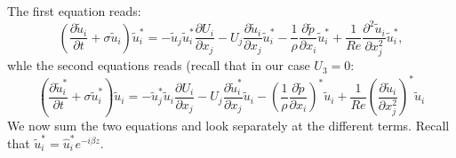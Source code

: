 \documentclass{jfm}
\begin{document}
The first equation reads:
%
\begin{equation}
\left( \frac{\partial \tilde{u}_i}{\partial t} + \sigma \tilde{u}_i \right) \tilde{u}^*_i =
- \tilde{u}_j \tilde{u}_i^* \frac{\partial U_i}{\partial x_j} - U_j \frac{\partial \tilde{u}_i}{\partial x_j} \tilde{u}_i^*
- \frac{1}{\rho} \frac{\partial \tilde{p}}{\partial x_i} \tilde{u}_i^* 
+ \frac{1}{Re} \frac{\partial^2 \tilde{u}_i}{\partial x_j^2} \tilde{u}_i^*,
\end{equation}
whle the second equations reads (recall that in our case $U_3=0$:
\begin{equation}
\left( \frac{\partial \tilde{u}_i^*}{\partial t} + \sigma \tilde{u}_i^* \right) \tilde{u}_i = 
- \tilde{u}_j^* \tilde{u}_i \frac{\partial U_i}{\partial x_j} - U_j \frac{\partial \tilde{u}_i^*}{\partial x_j} \tilde{u}_i
- \left( \frac{1}{\rho} \frac{\partial \tilde{p}}{\partial x_i} \right)^* \tilde{u}_i + 
\frac{1}{Re} \left( \frac{\partial \tilde{u}_i}{\partial x_j^2} \right)^* \tilde{u}_i
\end{equation}
%
We now sum the two equations and look separately at the different terms. Recall that $\tilde{u}_i^* = \hat{u}_i^* e^{-i\beta z}$.
\end{document}
